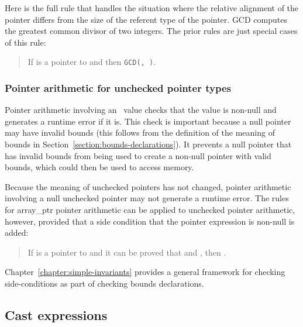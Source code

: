 Here is the full rule that handles the situation where the relative
alignment of the pointer differs from the size of the referent type of
the pointer. GCD computes the greatest common divisor of two integers.
The prior rules are just special cases of this rule:

\begin{quote}
If  is a pointer to  and 
            {
                       {}
                       {}}
then 
                 {
                            {}
                            {\texttt{GCD(, )}}}.
\end{quote}

\subsubsection{Pointer arithmetic for unchecked pointer types}

Pointer arithmetic involving an \arrayptr\ value checks that
the value is non-null and generates a runtime error if it is. This check
is important because a null pointer may have invalid bounds (this
follows from the definition of the meaning of bounds in 
Section~\ref{section:bounds-declarations}). It
prevents a null pointer that has invalid bounds from being used to create a
non-null pointer with valid bounds, which could then be used to access
memory.

Because the meaning of unchecked pointers has not changed, pointer
arithmetic involving a null unchecked pointer may not generate a runtime
error. The rules for array\_ptr pointer arithmetic can be applied to
unchecked pointer arithmetic, however, provided that a side condition that
the pointer expression is non-null is added:

\begin{quote}
If  is a pointer to  and it can be proved that
  and 
, then
.
\end{quote}

Chapter~\ref{chapter:simple-invariants}
provides a general framework for checking side-conditions as
part of checking bounds declarations.

\subsection{Cast expressions}
\label{section:cast-expressions}

